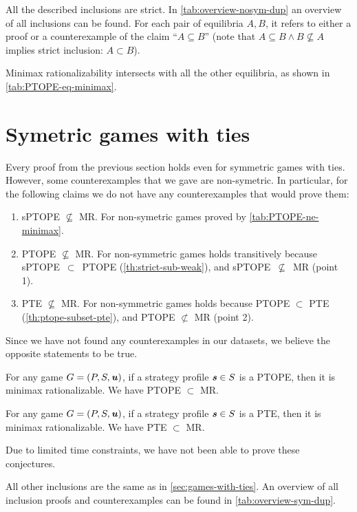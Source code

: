 All the described inclusions are strict.
In \autoref{tab:overview-nosym-dup} an overview of all inclusions can be found.
For each pair of equilibria $A, B$, it refers to either a proof or a counterexample of the claim \enquote{$A \subseteq B$} (note that $A \subseteq B \land B \not\subseteq A$ implies strict inclusion: $A \subset B$).

Minimax rationalizability intersects with all the other equilibria, as shown in \autoref{tab:PTOPE-eq-minimax}.


\section{Symetric games with ties}
Every proof from the previous section holds even for symmetric games with ties.
However, some counterexamples that we gave are non-symetric.
In particular, for the following claims we do not have any counterexamples that would prove them:
\begin{enumerate}
	\item sPTOPE $\not\subseteq$ MR. For non-symetric games proved by \autoref{tab:PTOPE-ne-minimax}.
	\item PTOPE $\not\subseteq$ MR. For non-symmetric games holds transitively because sPTOPE~$\subset$~PTOPE (\autoref{th:strict-sub-weak}), and sPTOPE~$\not\subseteq$~MR (point 1).
	\item PTE $\not\subseteq$ MR. For non-symmetric games holds because PTOPE $\subset$ PTE (\autoref{th:ptope-subset-pte}), and PTOPE $\not\subset$ MR (point 2).
\end{enumerate}
Since we have not found any counterexamples in our datasets, we believe the opposite statements to be true.

\begin{conjecture}
	For any game $G = (P, S, \boldsymbol{\mathit{u}})$, if a strategy profile $\boldsymbol{\mathit{s}} \in S$ is a PTOPE, then it is minimax rationalizable.
	We have PTOPE $\subset$ MR.
\end{conjecture}

\begin{conjecture}
	For any game $G = (P, S, \boldsymbol{\mathit{u}})$, if a strategy profile $\boldsymbol{\mathit{s}} \in S$ is a PTE, then it is minimax rationalizable.
	We have PTE $\subset$ MR.
\end{conjecture}

Due to limited time constraints, we have not been able to prove these conjectures.

All other inclusions are the same as in \autoref{sec:games-with-ties}.
An overview of all inclusion proofs and counterexamples can be found in \autoref{tab:overview-sym-dup}.


